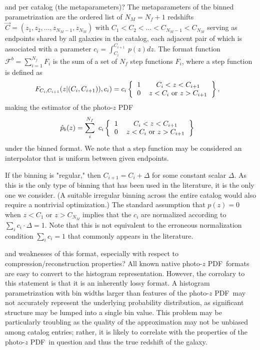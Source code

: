 \documentclass[\docopts]{\docclass}
\newcommand{\pz}{photo-$z$ PDF}
\begin{document}
and per catalog (the metaparameters)?
The metaparameters of the binned parametrization are the ordered list of 
$N_{M}=N_{f}+1$ redshifts $\vec{C} = (z_{1}, z_{2}, \dots, z_{N_{M}-1}, 
z_{N_{M}})$ with $C_{1} < C_{2} < \dots < C_{N_{M}-1} < C_{N_{M}}$ serving as 
endpoints shared by all galaxies in the catalog, each adjacent pair of which is 
associated with a parameter $c_{i}=\int_{C_{i}}^{C_{i+1}}\ p(z)dz$.  The format 
function $\mathcal{F}^{b}=\sum_{i=1}^{N_{f}}F_{i}$ is the sum of a set of 
$N_{f}$ step functions $F_{i}$, where a step function is defined as
\begin{align}
  \label{eq:step}
  F_{C_{i}, C_{i+1}}(z| (C_{i}, C_{i+1})), c_{i}) &= c_{i} 
\left\{\begin{tabular}{cc}$1$&$C_{i}<z<C_{i+1}$\\
0&$z < C_{i}$\ or\ $z > C_{i+1}$\end{tabular}\right\},
\end{align}
making the estimator of the \pz\
\begin{align}
  \label{eq:binned}
  \hat{p}_{b}(z) &= \sum_{i}^{N_{f}}\ c_{i} 
\left\{\begin{tabular}{cc}$1$&$C_{i}<z<C_{i+1}$\\
0&$z < C_{i}$\ or\ $z > C_{i+1}$\end{tabular}\right\}
\end{align}
under the binned format.  We note that a step function may be considered an 
interpolator that is uniform between given endpoints.

If the binning is "regular," then $C_{i+1}=C_{i}+\Delta$ for some constant 
scalar $\Delta$.  As this is the only type of binning that has been used in the 
literature, it is the only one we consider.  (A suitable irregular binning 
across the entire catalog would also require a nontrivial optimization.)  The 
standard assumption that $p(z)=0$ when $z<C_{1}$ or $z>C_{N_{M}}$ implies that 
the $c_{i}$ are normalized according to $\sum_{i} c_{i}\cdot\Delta = 1$.  Note 
that this is not equivalent to the erroneous normalization condition $\sum_{i} 
c_{i} = 1$ that commonly appears in the literature.

and weaknesses of this format, especially with respect to 
compression/reconstruction properties?
All known native \pz\ formats are easy to convert to the histogram 
representation.  However, the corrolary to this statement is that it is an 
inherently lossy format.  A histogram parametrization with bin widths larger 
than features of the \pz\ may not accurately represent the underlying 
probability distribution, as significant structure may be lumped into a single 
bin value.  This problem may be particularly troubling as the quality of the 
approximation may not be unbiased among catalog entries; rather, it is likely 
to correlate with the properties of the \pz\ in question and thus the true 
redshift of the galaxy.
\end{document}
